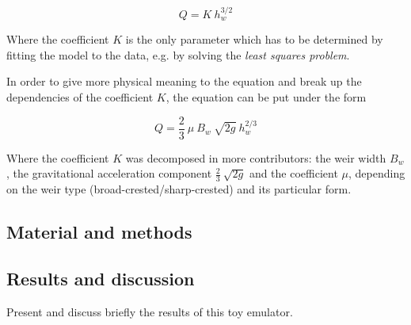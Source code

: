 \begin{equation}
  Q = K\: h_w^{3/2}
\end{equation}

\noindent Where the coefficient $K$ is the only parameter which has to be determined by fitting the model to the data, e.g. by solving the \emph{least squares problem}.

In order to give more physical meaning to the equation and break up the dependencies of the coefficient $K$, the equation can be put under the form

\begin{equation}
  Q = \frac{2}{3}\: \mu\: B_w\: \sqrt{2g}\: h_w^{2/3}
\end{equation}

\noindent Where the coefficient $K$ was decomposed in more contributors: the weir width $B_w$, the gravitational acceleration component $\frac{2}{3}\: \sqrt{2g}$  and the coefficient $\mu$, depending on the weir type (broad-crested/sharp-crested) and its particular form.


\subsection{Material and methods}


\subsection{Results and discussion}

Present and discuss briefly the results of this toy emulator.



